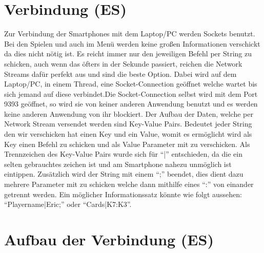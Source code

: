 \section{Verbindung (ES)} \label{verbindung}
Zur Verbindung der Smartphones mit dem Laptop/PC werden Sockets benutzt. Bei den Spielen und auch im Menü werden keine großen Informationen verschickt da dies nicht nötig ist. Es reicht immer nur den jeweiligen Befehl per String zu schicken, auch wenn das öfters in der Sekunde passiert, reichen die Network Streams dafür perfekt aus und sind die beste Option. Dabei wird auf dem Laptop/PC, in einem Thread, eine Socket-Connection geöffnet welche wartet bis sich jemand auf diese verbindet.Die Socket-Connection selbst wird mit dem Port 9393 geöffnet, so wird sie von keiner anderen Anwendung benutzt und es werden keine anderen Anwendung von ihr blockiert. Der Aufbau der Daten, welche per Network Stream versendet werden sind Key-Value Pairs. Bedeutet jeder String den wir verschicken hat einen Key und ein Value, womit es ermöglicht wird als Key einen Befehl zu schicken und als Value Parameter mit zu verschicken. Als Trennzeichen des Key-Value Pairs wurde sich für “|” entschieden, da die ein selten gebrauchtes zeichen ist und am Smartphone nahezu unmöglich ist eintippen. Zusätzlich wird der String mit einem “;” beendet, dies dient dazu mehrere Parameter mit zu schicken welche dann mithilfe eines “:” von einander getrennt werden. Ein möglicher Informationssatz könnte wie folgt aussehen: “Playername|Eric;” oder “Cards|K7:K3”.
\section{Aufbau der Verbindung (ES)} 
